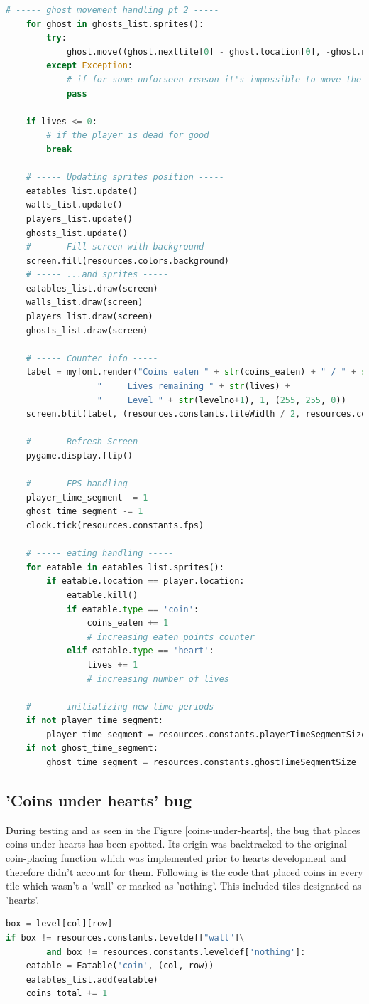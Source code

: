 \documentclass[11pt,a4paper,notitlepage]{report}
\newcommand{\dsubsection}[1]{\FloatBarrier \subsection{#1}}
\begin{document}
\begin{lstlisting}[language=Python]
	# ----- ghost movement handling pt 2 -----
	for ghost in ghosts_list.sprites():
		try:
			ghost.move((ghost.nexttile[0] - ghost.location[0], -ghost.nexttile[1] + ghost.location[1]), ghost_part)
		except Exception:
			# if for some unforseen reason it's impossible to move the ghost just leave it there
			pass

	if lives <= 0:
		# if the player is dead for good
		break

	# ----- Updating sprites position -----
	eatables_list.update()
	walls_list.update()
	players_list.update()
	ghosts_list.update()
	# ----- Fill screen with background -----
	screen.fill(resources.colors.background)
	# ----- ...and sprites -----
	eatables_list.draw(screen)
	walls_list.draw(screen)
	players_list.draw(screen)
	ghosts_list.draw(screen)

	# ----- Counter info -----
	label = myfont.render("Coins eaten " + str(coins_eaten) + " / " + str(coins_total) +
				  "     Lives remaining " + str(lives) +
				  "     Level " + str(levelno+1), 1, (255, 255, 0))
	screen.blit(label, (resources.constants.tileWidth / 2, resources.constants.gamesize * resources.constants.tileWidth))

	# ----- Refresh Screen -----
	pygame.display.flip()

	# ----- FPS handling -----
	player_time_segment -= 1
	ghost_time_segment -= 1
	clock.tick(resources.constants.fps)

	# ----- eating handling -----
	for eatable in eatables_list.sprites():
		if eatable.location == player.location:
			eatable.kill()
			if eatable.type == 'coin':
				coins_eaten += 1
				# increasing eaten points counter
			elif eatable.type == 'heart':
				lives += 1
				# increasing number of lives

	# ----- initializing new time periods -----
	if not player_time_segment:
		player_time_segment = resources.constants.playerTimeSegmentSize
	if not ghost_time_segment:
		ghost_time_segment = resources.constants.ghostTimeSegmentSize
				\end{lstlisting}
			\dsubsection{'Coins under hearts' bug}
				During testing and as seen in the Figure \ref{coins-under-hearts}, the bug that places coins under hearts has been spotted. Its origin was backtracked to the original coin-placing function which was implemented prior to hearts development and therefore didn't account for them. Following is the code that placed coins in every tile which wasn't a 'wall' or marked as 'nothing'. This included tiles designated as 'hearts'.
				\begin{lstlisting}[language=Python]
box = level[col][row]
if box != resources.constants.leveldef["wall"]\
		and box != resources.constants.leveldef['nothing']:
	eatable = Eatable('coin', (col, row))
	eatables_list.add(eatable)
	coins_total += 1
				\end{lstlisting}
\end{document}
